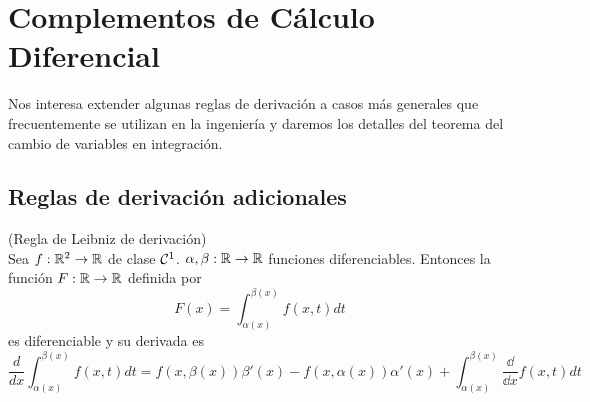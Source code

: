 \chapter{Complementos de C\'alculo Diferencial}\label{cap6}

Nos interesa extender algunas reglas de derivaci\'on a casos m\'as generales que frecuentemente se utilizan en la ingenier\'ia y daremos los detalles del teorema del cambio de variables en integraci\'on.

\section{Reglas de derivaci\'on adicionales}

\begin{teorema}{\rm (Regla de Leibniz de derivaci\'on)}
\\Sea $f:\mathbb{R}^2\to \mathbb{R}$ de clase ${\cal{C}}^1$. $\alpha,\beta:\mathbb{R}\to\mathbb{R}$
funciones diferenciables. Entonces la funci\'on $F:\mathbb{R}\to\mathbb{R}$
definida por
\[F(x)=\int_{\alpha(x)}^{\beta(x)}f(x,t)dt\]
es diferenciable y su derivada es
\[\frac{d}{dx}\int_{\alpha(x)}^{\beta(x)}f(x,t)dt=f(x,\beta(x))\beta
'(x)-f(x,\alpha(x))\alpha
'(x)+\int_{\alpha(x)}^{\beta(x)}\frac{\dd}{\dd x}f(x,t)dt\]
\end{teorema}

